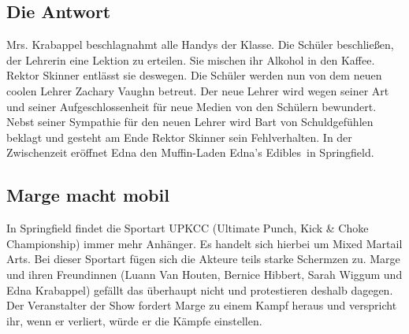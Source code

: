 
\subsection{Die Antwort}\label{LABF15}
Mrs. Krabappel beschlagnahmt alle Handys der Klasse. Die Schüler beschließen, der Lehrerin eine Lektion zu erteilen. Sie mischen ihr Alkohol in den Kaffee. Rektor Skinner entlässt sie deswegen. Die Schüler werden nun von dem neuen coolen Lehrer Zachary Vaughn betreut. Der neue Lehrer wird wegen seiner Art und seiner Aufgeschlossenheit für neue Medien von den Schülern bewundert. Nebst seiner Sympathie für den neuen Lehrer wird Bart von Schuldgefühlen beklagt und gesteht am Ende Rektor Skinner sein Fehlverhalten. In der Zwischenzeit eröffnet Edna den Muffin-Laden \glqq Edna's Edibles\grqq\ in Springfield.


\subsection{Marge macht mobil}\label{LABF16}
In Springfield findet die Sportart UPKCC (Ultimate Punch, Kick \& Choke Championship) immer mehr Anhänger. Es handelt sich hierbei um \glqq Mixed Martail Arts\grqq . Bei dieser Sportart fügen sich die Akteure teils starke Schermzen zu. Marge und ihren Freundinnen (Luann Van Houten, Bernice Hibbert, Sarah Wiggum und Edna Krabappel) gefällt das überhaupt nicht und protestieren deshalb dagegen. Der Veranstalter der Show fordert Marge zu einem Kampf heraus und verspricht ihr, wenn er verliert, würde er die Kämpfe einstellen.

